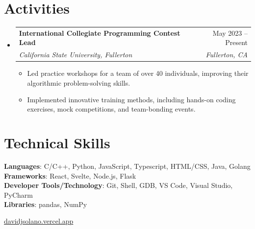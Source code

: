 \documentclass[letterpaper,11pt]{article}
\makeatletter
\newcommand{\resumeItem}[1]{
  \item\small{
    {#1 \vspace{-2pt}}
  }
}
\newcommand{\resumeSubheading}[4]{
  \vspace{-2pt}\item
    \begin{tabular*}{0.97\textwidth}[t]{l@{\extracolsep{\fill}}r}
      \textbf{#1} & #2 \\
      \textit{\small#3} & \textit{\small #4} \\
    \end{tabular*}\vspace{-7pt}
}
\newcommand{\resumeSubHeadingListStart}{\begin{itemize}[leftmargin=0.15in, label={}]}
\newcommand{\resumeSubHeadingListEnd}{\end{itemize}}
\newcommand{\resumeItemListStart}{\begin{itemize}}
\newcommand{\resumeItemListEnd}{\end{itemize}\vspace{-5pt}}
\makeatother
\begin{document}
%
\section{Activities}
  \resumeSubHeadingListStart

    \resumeSubheading
      {International Collegiate Programming Contest Lead}{May 2023 -- Present}
      {California State University, Fullerton}{Fullerton, CA}
      \resumeItemListStart
        \resumeItem{Led practice workshops for a team of over 40 individuals, improving their algorithmic problem-solving skills.}
        \resumeItem{Implemented innovative training methods, including hands-on coding exercises, mock competitions, and team-bonding events.}
      \resumeItemListEnd

  \resumeSubHeadingListEnd
\section{Technical Skills}
 \begin{itemize}[leftmargin=0.15in, label={}]
    \small{\item{
     \textbf{Languages}{: C/C++, Python, JavaScript, Typescript, HTML/CSS, Java, Golang} \\
     \textbf{Frameworks}{: React, Svelte, Node.js, Flask} \\
     \textbf{Developer Tools/Technology}{: Git, Shell, GDB, VS Code, Visual Studio, PyCharm} \\
     \textbf{Libraries}{: pandas, NumPy}
    }}
 \end{itemize}

\begin{center}
  \small \vspace{10pt} \href{https://davidjsolano.vercel.app}{davidjsolano.vercel.app}
\end{center}
\end{document}
